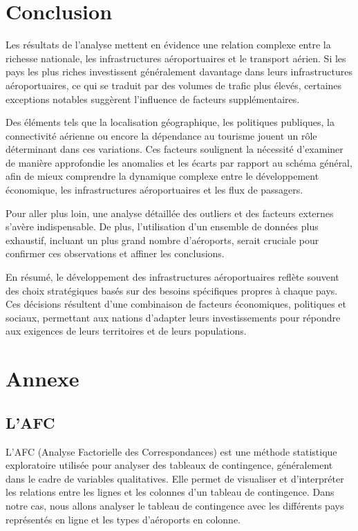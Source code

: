 \documentclass[
]{compterendu}
\begin{document}
\section{\texorpdfstring{\textbf{Conclusion}}{Conclusion}}\label{conclusion}

Les résultats de l'analyse mettent en évidence une relation complexe
entre la richesse nationale, les infrastructures aéroportuaires et le
transport aérien. Si les pays les plus riches investissent généralement
davantage dans leurs infrastructures aéroportuaires, ce qui se traduit
par des volumes de trafic plus élevés, certaines exceptions notables
suggèrent l'influence de facteurs supplémentaires.

Des éléments tels que la localisation géographique, les politiques
publiques, la connectivité aérienne ou encore la dépendance au tourisme
jouent un rôle déterminant dans ces variations. Ces facteurs soulignent
la nécessité d'examiner de manière approfondie les anomalies et les
écarts par rapport au schéma général, afin de mieux comprendre la
dynamique complexe entre le développement économique, les
infrastructures aéroportuaires et les flux de passagers.

Pour aller plus loin, une analyse détaillée des outliers et des facteurs
externes s'avère indispensable. De plus, l'utilisation d'un ensemble de
données plus exhaustif, incluant un plus grand nombre d'aéroports,
serait cruciale pour confirmer ces observations et affiner les
conclusions.

En résumé, le développement des infrastructures aéroportuaires reflète
souvent des choix stratégiques basés sur des besoins spécifiques propres
à chaque pays. Ces décisions résultent d'une combinaison de facteurs
économiques, politiques et sociaux, permettant aux nations d'adapter
leurs investissements pour répondre aux exigences de leurs territoires
et de leurs populations.

\section{\texorpdfstring{\textbf{Annexe}}{Annexe}}\label{annexe}

\subsection{L'AFC}\label{lafc}

L'AFC (Analyse Factorielle des Correspondances) est une méthode
statistique exploratoire utilisée pour analyser des tableaux de
contingence, généralement dans le cadre de variables qualitatives. Elle
permet de visualiser et d'interpréter les relations entre les lignes et
les colonnes d'un tableau de contingence. Dans notre cas, nous allons
analyser le tableau de contingence avec les différents pays représentés
en ligne et les types d'aéroports en colonne.
\end{document}
